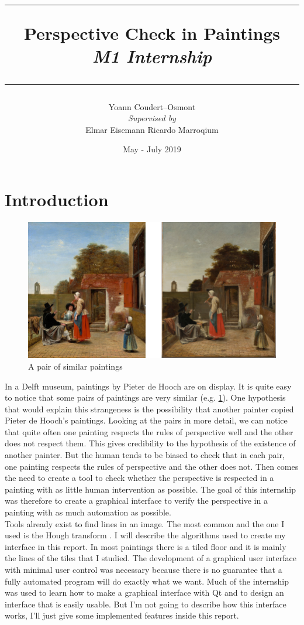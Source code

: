 \documentclass[11pt]{article}
\title{
	\rule{\linewidth}{0.4mm}
	\textbf{Perspective Check in Paintings} \\
	\textit{M1 Internship}
	\rule{\linewidth}{0.6mm} \vspace{-10mm}
}
\author{
	Yoann Coudert--Osmont \\[1.5mm]
	\textit{Supervised by} \\
	Elmar Eisemann \qquad Ricardo Marroqium \\[2mm]
}
\date{May - July 2019}
\begin{document}
	\maketitle
	
	\section*{Introduction}
	
	\begin{figure}
		\centering
		\includegraphics[scale=1.25]{paintings_pair.jpg}
		\caption{A pair of similar paintings}
		\label{im:pair}
	\end{figure}

	In a Delft museum, paintings by Pieter de Hooch are on display. It is quite easy to notice that some pairs of paintings are very similar (e.g. \figurename \ref{im:pair}). One hypothesis that would explain this strangeness is the possibility that another painter copied Pieter de Hooch's paintings. Looking at the pairs in more detail, we can notice that quite often one painting respects the rules of perspective well and the other does not respect them. This gives credibility to the hypothesis of the existence of another painter. But the human tends to be biased to check that in each pair, one painting respects the rules of perspective and the other does not. Then comes the need to create a tool to check whether the perspective is respected in a painting with as little human intervention as possible. The goal of this internship was therefore to create a graphical interface to verify the perspective in a painting with as much automation as possible. \\
	Tools already exist to find lines in an image. The most common and the one I used is the Hough transform \cite{hough}. I will describe the algorithms used to create my interface in this report. In most paintings there is a tiled floor and it is mainly the lines of the tiles that I studied. The development of a graphical user interface with minimal user control was necessary because there is no guarantee that a fully automated program will do exactly what we want. Much of the internship was used to learn how to make a graphical interface with Qt and to design an interface that is easily usable. But I'm not going to describe how this interface works, I'll just give some implemented features inside this report.
\end{document}
